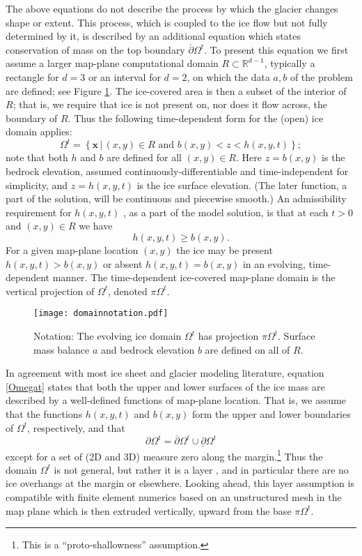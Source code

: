 \documentclass[letterpaper,final,12pt,reqno]{amsart}
\newcommand{\RR}{\mathbb{R}}
\newcommand{\bx}{\mathbf{x}}
\begin{document}
The above equations do not describe the process by which the glacier changes shape or extent.  This process, which is coupled to the ice flow but not fully determined by it, is described by an additional equation which states conservation of mass on the top boundary $\overline{\partial} \Omega^t$.  To present this equation we first assume a larger map-plane computational domain $R\subset \RR^{d-1}$, typically a rectangle for $d=3$ or an interval for $d=2$, on which the data $a,b$ of the problem are defined; see Figure \ref{fig:domainnotation}.  The ice-covered area is then a subset of the interior of $R$; that is, we require that ice is not present on, nor does it flow across, the boundary of $R$.  Thus the following time-dependent form for the (open) ice domain applies:
\begin{equation}
\Omega^t = \left\{\bx\,\big|\,(x,y)\in R \text{ and } b(x,y) < z < h(x,y,t)\right\};  \label{Omegat}
\end{equation}
note that both $h$ and $b$ are defined for all $(x,y)\in R$.  Here $z=b(x,y)$ is the bedrock elevation, assumed continuously-differentiable and time-independent for simplicity, and $z=h(x,y,t)$ is the ice surface elevation.  (The later function, a part of the solution, will be continuous and piecewise smooth.)  An admissibility requirement for $h(x,y,t)$ \cite{Bueler2016}, as a part of the model solution, is that at each $t>0$ and $(x,y)\in R$ we have
\begin{equation}
h(x,y,t) \ge b(x,y).  \label{admissibility}
\end{equation}
For a given map-plane location $(x,y)$ the ice may be present $h(x,y,t)>b(x,y)$ or absent $h(x,y,t)=b(x,y)$ in an evolving, time-dependent manner.  The time-dependent ice-covered map-plane domain is the vertical projection of $\Omega^t$, denoted $\pi \Omega^t$.

\begin{figure}[h]
\begin{center}
\texttt{[image: domainnotation.pdf]}
\end{center}
\caption{Notation: The evolving ice domain $\Omega^t$ has projection $\pi \Omega^t$.  Surface mass balance $a$ and bedrock elevation $b$ are defined on all of $R$.}
\label{fig:domainnotation}
\end{figure}

In agreement with most ice sheet and glacier modeling literature, equation \eqref{Omegat} states that both the upper and lower surfaces of the ice mass are described by a well-defined functions of map-plane location.  That is, we assume that the functions $h(x,y,t)$ and $b(x,y)$ form the upper and lower boundaries of $\Omega^t$, respectively, and that
    $$\partial \Omega^t = \overline{\partial} \Omega^t \cup \underline{\partial} \Omega^t$$
except for a set of (2D and 3D) measure zero along the margin.\footnote{This is a ``proto-shallowness'' assumption.}  Thus the domain $\Omega^t$ is not general, but rather it is a layer \cite{Bueler2020}, and in particular there are no ice overhangs at the margin or elsewhere.  Looking ahead, this layer assumption is compatible with finite element numerics based on an unstructured mesh in the map plane which is then extruded vertically, upward from the base $\pi\Omega^t$.
\end{document}
